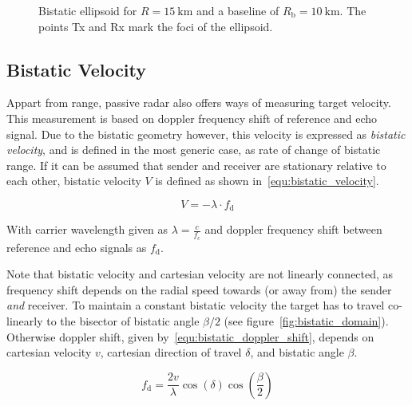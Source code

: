 \begin{figure}
    \centering
    \begin{tikzpicture}
        
    \end{tikzpicture}
    \caption{Bistatic ellipsoid for \(R=\SI{15}{\kilo\metre}\) and a baseline of \(R_{\text{b}}=\SI{10}{\kilo\metre}\). The points Tx and Rx mark the foci of the ellipsoid.}\label{fig:bistatic_ellipsoid}
\end{figure}

\subsection{Bistatic Velocity}

Appart from range, passive radar also offers ways of measuring target velocity. This measurement is based on doppler frequency shift of reference and echo signal. Due to the bistatic geometry however, this velocity is expressed as \emph{bistatic velocity}, and is defined in the most generic case, as rate of change of bistatic range. If it can be assumed that sender and receiver are stationary relative to each other, bistatic velocity \(V\) is defined as shown in~\ref{equ:bistatic_velocity}.~\cite[p.~12]{Malanowski2019}

\begin{equation}\label{equ:bistatic_velocity}
    V = -\lambda \cdot f_{\text{d}}
\end{equation}

With carrier wavelength given as \(\lambda=\frac{c}{f_{c}}\) and doppler frequency shift between reference and echo signals as \(f_{\text{d}}\).

Note that bistatic velocity and cartesian velocity are not linearly connected, as frequency shift depends on the radial speed towards (or away from) the sender \emph{and} receiver. To maintain a constant bistatic velocity the target has to travel co-linearly to the bisector of bistatic angle \(\beta/2\) (see figure~\ref{fig:bistatic_domain}). Otherwise doppler shift, given by~\ref{equ:bistatic_doppler_shift}, depends on cartesian velocity \(v\), cartesian direction of travel \(\delta\), and bistatic angle \(\beta\).~\cite[p.~39]{Griffiths2017}

\begin{equation}\label{equ:bistatic_doppler_shift}
    f_{\text{d}} = \frac{2v}{\lambda} \cos{\left(\delta\right)}\cos{\left(\frac{\beta}{2}\right)}
\end{equation}

